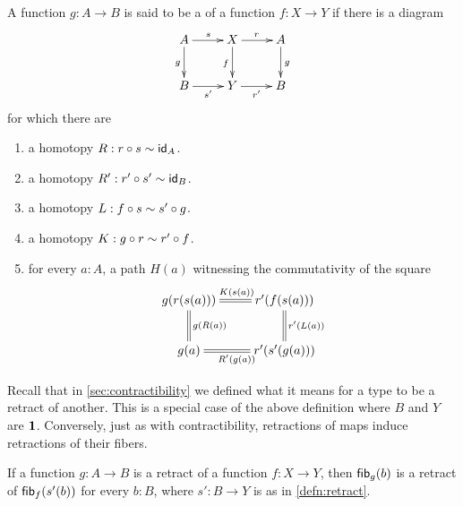 \begin{defn}\label{defn:retract}
A function $g:A\to B$ is said to be a  of a function $f:X\to Y$ if there is a diagram
\begin{equation*}
  \xymatrix{
    {A} \ar[r]^{s} \ar[d]_{g}
    &
    {X} \ar[r]^{r} \ar[d]_{f}
    &
    {A} \ar[d]^{g}
    \\
    {B} \ar[r]_{s'}
    &
    {Y} \ar[r]_{r'}
    &
    {B}
  }
\end{equation*}
for which there are
\begin{enumerate}
\item a homotopy $R:r\circ s \htpy \idfunc[A]$.
\item a homotopy $R^\prime:r^\prime\circ s^\prime \htpy\idfunc[B]$.
\item a homotopy $L:f\circ s\htpy s'\circ g$.
\item a homotopy $K:g\circ r\htpy r'\circ f$.
\item for every $a:A$, a path $H(a)$ witnessing the commutativity of the square
\begin{equation*}
  \xymatrix{
    {g(r(s(a)))} \ar@{=}[r]^{K(s(a))} \ar@{=}[d]^{g(R(a))}
    &
    {r'(f(s(a)))} \ar@{=}[d]^{r'(L(a))}
    \\
    {g(a)} \ar@{=}[r]_{R'(g(a))}
    &
    {r'(s'(g(a)))}
  }
\end{equation*}
\end{enumerate}
\end{defn}

Recall that in \autoref{sec:contractibility} we defined what it means for a type to be a retract of another.
This is a special case of the above definition where $B$ and $Y$ are $\unit$.
Conversely, just as with contractibility, retractions of maps induce retractions of their fibers.

\begin{lem}\label{lem:func_retract_to_fiber_retract}
If a function $g:A\to B$ is a retract of a function $f:X\to Y$, then $\hfib{g}b$ is a retract of $\hfib{f}{s^\prime(b)}$
for every $b:B$, where $s':B\to Y$ is as in \autoref{defn:retract}.
\end{lem}

